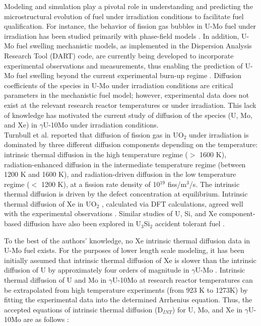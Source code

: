 \documentclass[preprint,12pt]{elsarticle}
\begin{document}
\indent Modeling and simulation play a pivotal role in understanding and predicting the microstructural evolution of fuel under irradiation conditions to facilitate fuel qualification. For instance, the behavior of fission gas bubbles in U-Mo fuel under irradiation has been studied primarily with phase-field models \cite{hu2009phase, hu2016formation, liang2018three, liang2018fission}. In addition, U-Mo fuel swelling mechanistic models, as implemented in the Dispersion Analysis Research Tool (DART) code, are currently being developed to incorporate experimental observations and measurements, thus enabling the prediction of U-Mo fuel swelling beyond the current experimental burn-up regime \cite{ye2015dart}. Diffusion coefficients of the species in U-Mo under irradiation conditions are critical parameters in the mechanistic fuel model; however, experimental data does not exist at the relevant research reactor temperatures or under irradiation. This lack of knowledge has motivated the current study of diffusion of the species (U, Mo, and Xe) in $\gamma$U-10Mo under irradiation conditions.\\ 
\indent Turnbull et al. \cite{turnbull1982diffusion} reported that diffusion of fission gas in UO$_{2}$ under irradiation is dominated by three different diffusion components depending on the temperature: intrinsic thermal diffusion in the high temperature regime ($>$ 1600 K), radiation-enhanced diffusion in the intermediate temperature regime (between 1200 K and 1600 K), and radiation-driven diffusion in the low temperature regime ($<$ 1200 K), at a fission rate density of 10$^{19}$ fiss/m$^{3}$/s. The intrinsic thermal diffusion is driven by the defect concentration at equilibrium. Intrinsic thermal diffusion of Xe in UO$_{2}$ \cite{perriot2019atomistic}, calculated via DFT calculations, agreed well with the experimental observations \cite{turnbull1982diffusion, davis1963aere}. Similar studies of U, Si, and Xe component-based diffusion have also been explored in U$_3$Si$_2$ accident tolerant fuel \cite{cooper2021irradiation, beeler2021radiation}. 

To the best of the authors' knowledge, no Xe intrinsic thermal diffusion data in U-Mo fuel exists. For the purposes of lower length scale modeling, it has been initially assumed that intrinsic thermal diffusion of Xe is slower than the intrinsic diffusion of U by approximately four orders of magnitude in $\gamma$U-Mo \cite{hu2016formation, hu2016microstructural, Beeler2018microstructural}. Intrinsic thermal diffusion of U and Mo in $\gamma$U-10Mo at research reactor temperatures can be extrapolated from high temperature experiments (from 923 K to 1273K) by fitting the experimental data \cite{huang2013} into the determined Arrhenius equation. Thus, the accepted equations of intrinsic thermal diffusion (D$_{INT}$) for U, Mo, and Xe in $\gamma$U-10Mo are as follows \cite{hu2016formation, hu2016microstructural, Beeler2018microstructural, huang2013}:
\end{document}
